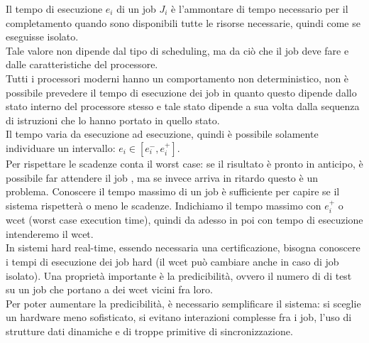 \documentclass[12pt, oneside]{extbook}
\begin{document}
Il tempo di esecuzione $e_i$ di un job $J_i$ è l'ammontare di tempo necessario per il completamento quando sono disponibili tutte le risorse necessarie, quindi come se eseguisse isolato.\\ Tale valore non dipende dal tipo di scheduling, ma da ciò che il job deve fare e dalle caratteristiche del processore.\\ Tutti i processori moderni hanno un comportamento non deterministico, non è possibile prevedere il tempo di esecuzione dei job in quanto questo dipende dallo stato interno del processore stesso e tale stato dipende a sua volta dalla sequenza di istruzioni che lo hanno portato in quello stato.\\ Il tempo varia da esecuzione ad esecuzione, quindi è possibile solamente individuare un intervallo: $e_i \in [e_i^{-}, e_i^{+}]$.\\ Per rispettare le scadenze conta il worst case: se il risultato è pronto in anticipo, è possibile far attendere il job , ma se invece arriva in ritardo questo è un problema. Conoscere il tempo massimo di un job è sufficiente per capire se il sistema rispetterà o meno le scadenze. Indichiamo il tempo massimo con $e_i^{+}$ o wcet (worst case execution time), quindi da adesso in poi con tempo di esecuzione intenderemo il wcet.\\ In sistemi hard real-time, essendo necessaria una certificazione, bisogna conoscere i tempi di esecuzione dei job hard (il wcet può cambiare anche in caso di job isolato). Una proprietà importante è la predicibilità, ovvero il numero di di test su un job che portano a dei wcet vicini fra loro.\\ Per poter aumentare la predicibilità, è necessario semplificare il sistema: si sceglie un hardware meno sofisticato, si evitano interazioni complesse fra i job, l'uso di strutture dati dinamiche e di troppe primitive di sincronizzazione.
\end{document}
